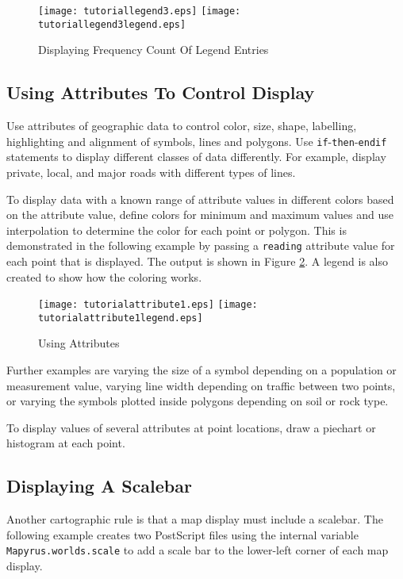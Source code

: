 \begin{figure}[htb]
\texttt{[image: tutoriallegend3.eps]}
\texttt{[image: tutoriallegend3legend.eps]}
\caption{Displaying Frequency Count Of Legend Entries}
\label{tutoriallegend3}
\end{figure}

\subsection{Using Attributes To Control Display}

Use attributes of geographic data to control
color, size, shape, labelling, highlighting and alignment of symbols, lines
and polygons.
Use \texttt{if}-\texttt{then}-\texttt{endif}
statements to display different classes of data
differently.  For example, display private, local, and major roads
with different types of lines.

To display data with a known range of attribute values in different
colors based on the attribute value, define colors for minimum and
maximum values and use interpolation to determine the color for
each point or polygon.  This is demonstrated in the following
example by passing a \texttt{reading} attribute value for each point
that is displayed.  The output is shown in Figure \ref{tutorialattribute1}.
A legend is also created to show how the coloring works.



\begin{figure}[htb]
\texttt{[image: tutorialattribute1.eps]}
\texttt{[image: tutorialattribute1legend.eps]}
\caption{Using Attributes}
\label{tutorialattribute1}
\end{figure}

Further examples are varying the size of a symbol depending on a
population or measurement value, varying line width depending on
traffic between two points, or varying the symbols plotted inside
polygons depending on soil or rock type.

To display values of several attributes at point locations, draw a
piechart or histogram at each point.

\subsection{Displaying A Scalebar}
\label{tutorialscalebar}

Another cartographic rule is that a map display must include a scalebar.  The
following example creates two PostScript files using the internal variable
\texttt{Mapyrus.worlds.scale} to add a scale bar to the lower-left corner
of each map display.

